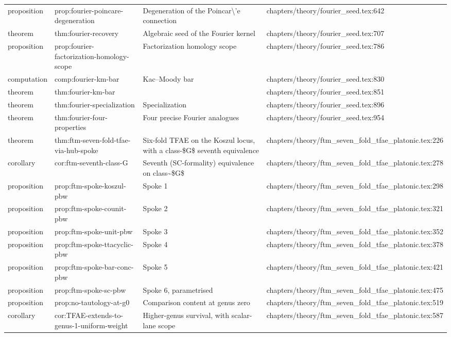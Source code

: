 \documentclass[11pt]{article}
\begin{document}
\begin{longtable}{L{0.10\textwidth}L{0.26\textwidth}L{0.42\textwidth}L{0.22\textwidth}}
proposition & prop:fourier-poincare-degeneration & Degeneration of the Poincar\textbackslash{}'e connection & chapters/theory/fourier\_seed.tex:642\\
theorem & thm:fourier-recovery & Algebraic seed of the Fourier kernel & chapters/theory/fourier\_seed.tex:707\\
proposition & prop:fourier-factorization-homology-scope & Factorization homology scope & chapters/theory/fourier\_seed.tex:786\\
computation & comp:fourier-km-bar & Kac--Moody bar & chapters/theory/fourier\_seed.tex:830\\
theorem & thm:fourier-km-bar &  & chapters/theory/fourier\_seed.tex:851\\
theorem & thm:fourier-specialization & Specialization & chapters/theory/fourier\_seed.tex:896\\
theorem & thm:fourier-four-properties & Four precise Fourier analogues & chapters/theory/fourier\_seed.tex:954\\
theorem & thm:ftm-seven-fold-tfae-via-hub-spoke & Six-fold TFAE on the Koszul locus, with a class-\$G\$ seventh equivalence & chapters/theory/ftm\_seven\_fold\_tfae\_platonic.tex:226\\
corollary & cor:ftm-seventh-class-G & Seventh (SC-formality) equivalence on class\textasciitilde{}\$G\$ & chapters/theory/ftm\_seven\_fold\_tfae\_platonic.tex:278\\
proposition & prop:ftm-spoke-koszul-pbw & Spoke 1 & chapters/theory/ftm\_seven\_fold\_tfae\_platonic.tex:298\\
proposition & prop:ftm-spoke-counit-pbw & Spoke 2 & chapters/theory/ftm\_seven\_fold\_tfae\_platonic.tex:321\\
proposition & prop:ftm-spoke-unit-pbw & Spoke 3 & chapters/theory/ftm\_seven\_fold\_tfae\_platonic.tex:352\\
proposition & prop:ftm-spoke-ttacyclic-pbw & Spoke 4 & chapters/theory/ftm\_seven\_fold\_tfae\_platonic.tex:378\\
proposition & prop:ftm-spoke-bar-conc-pbw & Spoke 5 & chapters/theory/ftm\_seven\_fold\_tfae\_platonic.tex:421\\
proposition & prop:ftm-spoke-sc-pbw & Spoke 6, parametrised & chapters/theory/ftm\_seven\_fold\_tfae\_platonic.tex:475\\
proposition & prop:no-tautology-at-g0 & Comparison content at genus zero & chapters/theory/ftm\_seven\_fold\_tfae\_platonic.tex:519\\
corollary & cor:TFAE-extends-to-genus-1-uniform-weight & Higher-genus survival, with scalar-lane scope & chapters/theory/ftm\_seven\_fold\_tfae\_platonic.tex:587\\

\end{longtable}
\end{document}
